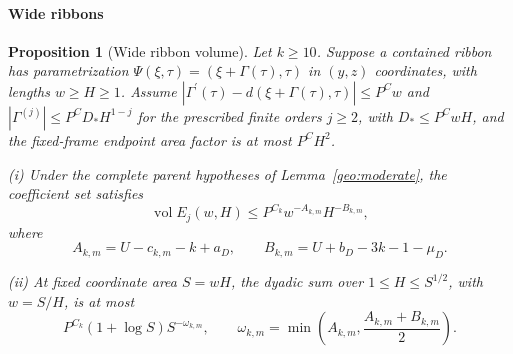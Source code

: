 \documentclass[11pt]{amsart}
\newtheorem{proposition}[theorem]{Proposition}
\theoremstyle{definition}
\theoremstyle{remark}
\numberwithin{equation}{section}
\begin{document}
\paragraph{Wide ribbons}

\begin{proposition}[Wide ribbon volume]\label{surf:wide}
Let $k\ge10$. Suppose a contained ribbon has parametrization $\Psi(\xi,\tau)=(\xi+\Gamma(\tau),\tau)$ in $(y,z)$ coordinates, with lengths $w\ge H\ge1$. Assume $|\Gamma^\prime(\tau)-d(\xi+\Gamma(\tau),\tau)|\le P^Cw$ and $|\Gamma^{(j)}|\le P^CD_*H^{1-j}$ for the prescribed finite orders $j\ge2$, with $D_*\le P^CwH$, and the fixed-frame endpoint area factor is at most $P^CH^2$.

\noindent\textup{(i)} Under the complete parent hypotheses of Lemma~\ref{geo:moderate}, the coefficient set satisfies
\begin{equation}\label{surf:wide-eq}
 \operatorname{vol}E_j(w,H)\le P^{C_k}w^{-A_{k,m}}H^{-B_{k,m}},
\end{equation}
where
\[
A_{k,m}=U-c_{k,m}-k+a_D,\qquad B_{k,m}=U+b_D-3k-1-\mu_D.
\]

\noindent\textup{(ii)} At fixed coordinate area $S=wH$, the dyadic sum over $1\le H\le S^{1/2}$, with $w=S/H$, is at most
\begin{equation}\label{surf:wide-sum}
P^{C_k}(1+\log S)S^{-\omega_{k,m}},\qquad \omega_{k,m}=\min\left(A_{k,m},\frac{A_{k,m}+B_{k,m}}2\right).
\end{equation}
\end{proposition}
\end{document}
